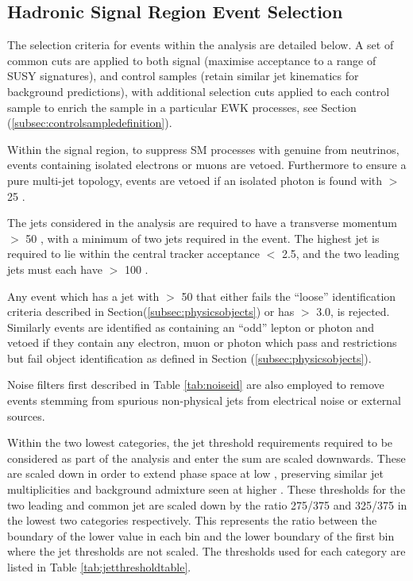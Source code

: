\subsection{Hadronic Signal Region Event Selection}
\label{subsec:eventselection}

The selection criteria for events within the analysis are detailed below. A set of common cuts are applied to both signal  (maximise acceptance to a range of \ac{SUSY} signatures),  and control samples (retain similar jet kinematics for background predictions), with additional selection cuts applied to each control sample to enrich the sample in a particular \ac{EWK} processes, see Section (\ref{subsec:controlsampledefinition}).


Within the signal region, to suppress \ac{SM} processes with genuine \met from neutrinos, events containing isolated electrons or muons are vetoed. Furthermore to ensure a pure multi-jet topology, events are vetoed if an isolated photon is found with \pt $>$ 25 \GeV. 

The jets considered in the analysis are required to have a transverse momentum \pt $>$ 50 \GeV, with a minimum of two jets required in the event. The highest \et jet is required to lie within the central tracker acceptance \abeta $<$ 2.5, and the two leading \pt jets must each have \pt $>$ 100 \GeV.  

Any event which has a jet with \pt $>$ 50 \GeV that either fails the ``loose'' identification criteria described in Section(\ref{subsec:physicsobjects}) or has \abeta $>$ 3.0, is rejected. Similarly events are identified as containing an ``odd'' lepton or photon and vetoed if they contain any electron, muon or photon which pass \eta and \pt restrictions but fail object identification as defined in Section (\ref{subsec:physicsobjects}).

Noise filters first described in Table \ref{tab:noiseid} are also employed to remove events stemming from spurious non-physical jets from electrical noise or external sources.

Within the two lowest \theht categories, the jet \pt threshold requirements required to be considered as part of the analysis and enter the \theht sum are scaled downwards. These are scaled down in order to extend phase space at low \theht, preserving similar jet multiplicities and background admixture seen at higher \theht. These thresholds for the two leading and common jet are scaled down by the ratio 275/375 and 325/375 in the lowest two \theht categories respectively. This represents the ratio between the boundary of the lower \theht value in each bin and the lower boundary of the first \theht bin where the jet thresholds are not scaled. The thresholds used for each category are listed in Table \ref{tab:jetthresholdtable}.

